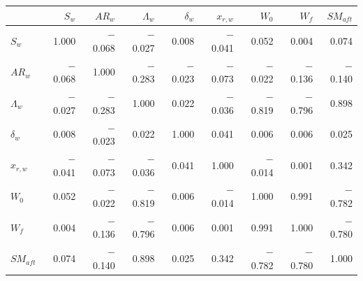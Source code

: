 \begin{tabular}{l|rrrrrrrr}
\toprule
 & $S_w$ & $AR_w$ & $\Lambda_w$ & $\delta_w$ & $x_{r,w}$ & $W_0$ & $W_f$ & $SM_{aft}$ \\
\midrule
$S_w$ & 1.000 & $-$0.068 & $-$0.027 & 0.008 & $-$0.041 & 0.052 & 0.004 & 0.074 \\
$AR_w$ & $-$0.068 & 1.000 & $-$0.283 & $-$0.023 & $-$0.073 & $-$0.022 & $-$0.136 & $-$0.140 \\
$\Lambda_w$ & $-$0.027 & $-$0.283 & 1.000 & 0.022 & $-$0.036 & $-$0.819 & $-$0.796 & 0.898 \\
$\delta_w$ & 0.008 & $-$0.023 & 0.022 & 1.000 & 0.041 & 0.006 & 0.006 & 0.025 \\
$x_{r,w}$ & $-$0.041 & $-$0.073 & $-$0.036 & 0.041 & 1.000 & $-$0.014 & 0.001 & 0.342 \\
$W_0$ & 0.052 & $-$0.022 & $-$0.819 & 0.006 & $-$0.014 & 1.000 & 0.991 & $-$0.782 \\
$W_f$ & 0.004 & $-$0.136 & $-$0.796 & 0.006 & 0.001 & 0.991 & 1.000 & $-$0.780 \\
$SM_{aft}$ & 0.074 & $-$0.140 & 0.898 & 0.025 & 0.342 & $-$0.782 & $-$0.780 & 1.000 \\
\bottomrule
\end{tabular}